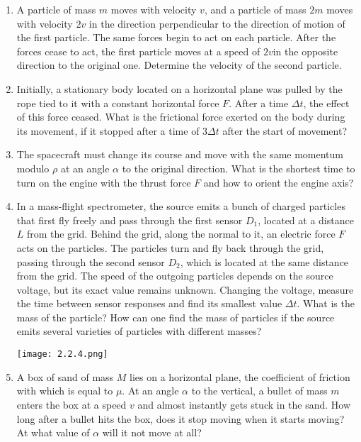 \documentclass{article}
\begin{document}
\begin{enumerate}[label=2.2.\arabic*]

\item A particle of mass $m$ moves with velocity $v$, and a particle of mass $2m$ moves with velocity $2v$ in the direction perpendicular to the direction of motion of the first particle. The same forces begin to act on each particle. After the forces cease to act, the first particle moves at a speed of $2v $in the opposite direction to the original one. Determine the velocity of the second particle.

\item Initially, a stationary body located on a horizontal plane was pulled by the rope tied to it with a constant horizontal force $F$. After a time $\Delta t$, the effect of this force ceased. What is the frictional force exerted on the body during its movement, if it stopped after a time of $3 \Delta t$ after the start of movement?

\item The spacecraft must change its course and move with the same momentum modulo $\rho$ at an angle $\alpha$ to the original direction. What is the shortest time to turn on the engine with the thrust force $F$ and how to orient the engine axis?

\item In a mass-flight spectrometer, the source emits a bunch of charged particles that first fly freely and pass through the first sensor $D_1$, located at a distance $L$ from the grid. Behind the grid, along the normal to it, an electric force $F$ acts on the particles. The particles turn and fly back through the grid, passing through the second sensor $D_2$, which is located at the same distance from the grid. The speed of the outgoing particles depends on the source voltage, but its exact value remains unknown. Changing the voltage, measure the time between sensor responses and find its smallest value $\Delta t$. What is the mass of the particle? How can one find the mass of particles if the source emits several varieties of particles with different masses?

\begin{center}
    \texttt{[image: 2.2.4.png]}
\end{center}

\item A box of sand of mass $M$ lies on a horizontal plane, the coefficient of friction with which is equal to $\mu$. At an angle $\alpha$ to the vertical, a bullet of mass $m$ enters the box at a speed $v$ and almost instantly gets stuck in the sand. How long after a bullet hits the box, does it stop moving when it starts moving? At what value of $\alpha$ will it not move at all?


\end{enumerate}
\end{document}
